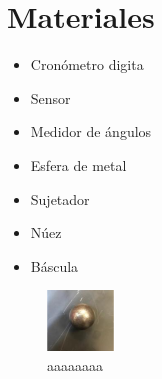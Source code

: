 \section{Materiales}
\begin{minipage}{0.8\linewidth}
    \begin{multicols}{2}
    \begin{itemize}
        \item Cronómetro digita
        \item Sensor
        \item Medidor de ángulos
        \item Esfera de metal
        \item Sujetador
        \item Núez
        \item Báscula
    \end{itemize}
\end{multicols}
\end{minipage}
\begin{minipage}{0.2\linewidth}
    \begin{figure}[H]
        \centering
        \includegraphics[scale=0.6]{Images/ima1.png}
        \caption{aaaaaaaa}
        \label{fig:ima1}
    \end{figure}
\end{minipage}
